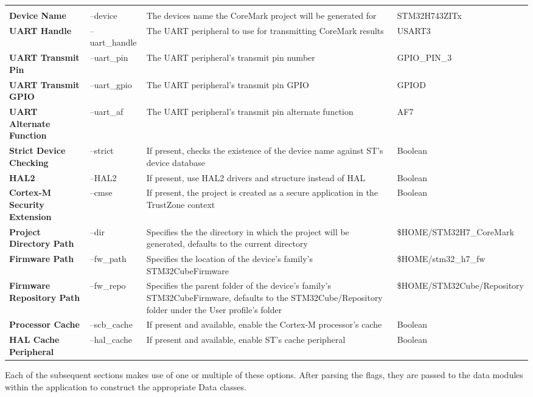 \begin{xltabular}{\linewidth}{@{}>{\bfseries}l X@{} X@{} X@{}}
	 \\
	\endfoot %
	\bottomrule
	\endlastfoot %
    Device Name & --device & The devices name the CoreMark project will be generated for & STM32H743ZITx \\
    \midrule
    UART Handle & --uart\_handle & The UART peripheral to use for transmitting CoreMark results & USART3 \\
    \midrule
    UART Transmit Pin & --uart\_pin & The UART peripheral's transmit pin number & GPIO\_PIN\_3 \\
    \midrule
    UART Transmit GPIO & --uart\_gpio & The UART peripheral's transmit pin GPIO & GPIOD \\
    \midrule
    UART Alternate Function & --uart\_af & The UART peripheral's transmit pin alternate function & AF7 \\
    \midrule
    Strict Device Checking & --strict & If present, checks the existence of the device name against ST's device database & Boolean \\
    \midrule
    HAL2 & --HAL2 & If present, use HAL2 drivers and structure instead of HAL & Boolean \\
    \midrule
    Cortex-M Security Extension & --cmse & If present, the project is created as a secure application in the TrustZone context & Boolean \\
    \midrule
    Project Directory Path & --dir & Specifies the the directory in which the project will be generated, defaults to the current directory & \$HOME/STM32H7\_CoreMark \\
    \midrule
    Firmware Path & --fw\_path & Specifies the location of the device's family's STM32CubeFirmware & \$HOME/stm32\_h7\_fw \\
    \midrule
    Firmware Repository Path & --fw\_repo & Specifies the parent folder of the device's family's STM32CubeFirmware, defaults to the STM32Cube/Repository folder under the User profile's folder& \$HOME/STM32Cube/Repository \\
    \midrule
    Processor Cache & --scb\_cache & If present and available, enable the Cortex-M processor's cache & Boolean \\
    \midrule
    HAL Cache Peripheral & --hal\_cache & If present and available, enable ST's cache peripheral& Boolean \\
\end{xltabular}
Each of the subsequent sections makes use of one or multiple of these options.
After parsing the flags, they are passed to the data modules within the application to construct the appropriate Data classes.
